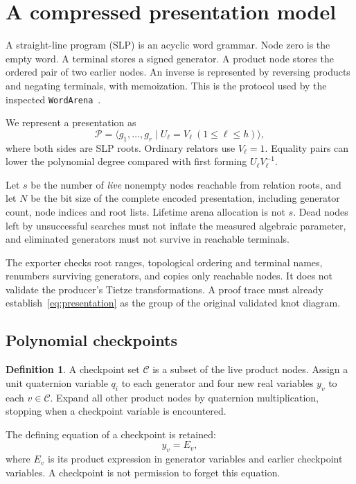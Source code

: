 \documentclass[11pt]{article}
\theoremstyle{definition}
\newtheorem{definition}[theorem]{Definition}
\theoremstyle{remark}
\newcommand{\code}[1]{\texttt{#1}}
\newcommand{\calC}{\mathcal C}
\newcommand{\calP}{\mathcal P}
\begin{document}
\section{A compressed presentation model}
\label{sec:model}

A straight-line program (SLP) is an acyclic word grammar. Node zero is the empty word. A terminal stores a signed generator. A product node stores the ordered pair of two earlier nodes. An inverse is represented by reversing products and negating terminals, with memoization. This is the protocol used by the inspected \code{WordArena}~\cite{repo-words}.

We represent a presentation as
\begin{equation}
\calP=\langle g_1,\ldots,g_r\mid U_\ell=V_\ell\ (1\le\ell\le h)\rangle,
\label{eq:presentation}
\end{equation}
where both sides are SLP roots. Ordinary relators use $V_\ell=1$. Equality pairs can lower the polynomial degree compared with first forming $U_\ell V_\ell^{-1}$.

Let $s$ be the number of \emph{live} nonempty nodes reachable from relation roots, and let $N$ be the bit size of the complete encoded presentation, including generator count, node indices and root lists. Lifetime arena allocation is not $s$. Dead nodes left by unsuccessful searches must not inflate the measured algebraic parameter, and eliminated generators must not survive in reachable terminals.

The exporter checks root ranges, topological ordering and terminal names, renumbers surviving generators, and copies only reachable nodes. It does not validate the producer's Tietze transformations. A proof trace must already establish~\eqref{eq:presentation} as the group of the original validated knot diagram.

\subsection{Polynomial checkpoints}
\begin{definition}
A checkpoint set $\calC$ is a subset of the live product nodes. Assign a unit quaternion variable $q_i$ to each generator and four new real variables $y_v$ to each $v\in\calC$. Expand all other product nodes by quaternion multiplication, stopping when a checkpoint variable is encountered.
\end{definition}
The defining equation of a checkpoint is retained:
\[
y_v=E_v,
\]
where $E_v$ is its product expression in generator variables and earlier checkpoint variables. A checkpoint is not permission to forget this equation.
\end{document}
